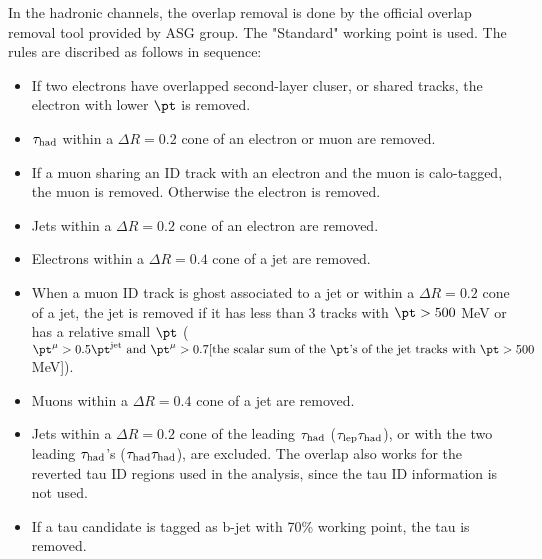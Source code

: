 In the hadronic channels, the overlap removal is done by the official overlap removal tool provided by ASG group. The "Standard" working point is used. The rules are discribed as follows in sequence:

\begin{itemize}
\item If two electrons have overlapped second-layer cluser, or shared tracks, the electron with lower $\pt$ is removed.
\item $\tau_\text{had}$ within a $\Delta R=0.2$ cone of an electron or muon are removed.
\item If a muon sharing an ID track with an electron and the muon is calo-tagged, the muon is removed. Otherwise the electron is removed.
\item Jets within a $\Delta R=0.2$ cone of an electron are removed.
\item Electrons within a $\Delta R=0.4$ cone of a jet are removed.
\item When a muon ID track is ghost associated to a jet or within a $\Delta R=0.2$ cone of a jet, the jet is removed if it has less than 3 tracks with $\pt>500$ MeV or has a relative small $\pt$ ($\pt^{\mu}>0.5\pt^{\text{jet}} \text{ and } \pt^{\mu}>0.7[\text{the scalar sum of the } \pt \text{'s of the jet tracks with } \pt>500$ MeV]).
\item Muons within a $\Delta R=0.4$ cone of a jet are removed.
\item Jets within a $\Delta R=0.2$ cone of the leading $\tau_\text{had}$ ($\tau_\text{lep}{}\tau_\text{had}$), or with the two leading $\tau_\text{had}$'s ($\tau_\text{had}{}\tau_\text{had}$), are excluded. The overlap also works for the reverted tau ID regions used in the analysis, since the tau ID information is not used.
\item If a tau candidate is tagged as b-jet with 70\% working point, the tau is removed.
\end{itemize}

